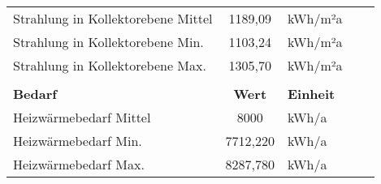 \begin{table}[]
{\begin{tabular}{lclcc}
    \multicolumn{1}{|l|}{Strahlung in Kollektorebene Mittel}                             & \multicolumn{1}{c|}{1189,09}                               & \multicolumn{1}{l|}{kWh/m²a}                                  &                                               &                                               \\ \cline{1-3}
    \multicolumn{1}{|l|}{Strahlung in Kollektorebene Min.}                               & \multicolumn{1}{c|}{1103,24}                               & \multicolumn{1}{l|}{kWh/m²a}                                  &                                               &                                               \\ \cline{1-3}
    \multicolumn{1}{|l|}{Strahlung in Kollektorebene Max.}                               & \multicolumn{1}{c|}{1305,70}                               & \multicolumn{1}{l|}{kWh/m²a}                                  &                                               &                                               \\ \cline{1-3}
                                                                                         &                                                            &                                                               &                                               &                                               \\ \cline{1-3}
    \multicolumn{1}{|l|}{\textbf{Bedarf}}                                                & \multicolumn{1}{c|}{\textbf{Wert}}                         & \multicolumn{1}{l|}{\textbf{Einheit}}                         &                                               &                                               \\ \cline{1-3}
    \multicolumn{1}{|l|}{Heizwärmebedarf Mittel}                                         & \multicolumn{1}{c|}{8000}                                  & \multicolumn{1}{l|}{kWh/a}                                    &                                               &                                               \\ \cline{1-3}
    \multicolumn{1}{|l|}{Heizwärmebedarf Min.}                                           & \multicolumn{1}{c|}{7712,220}                              & \multicolumn{1}{l|}{kWh/a}                                    &                                               &                                               \\ \cline{1-3}
    \multicolumn{1}{|l|}{Heizwärmebedarf Max.}                                           & \multicolumn{1}{c|}{8287,780}                              & \multicolumn{1}{l|}{kWh/a}                                    &                                               &                                               \\ \cline{1-3}

\end{tabular}}
\end{table}
